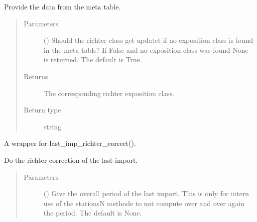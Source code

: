 \documentclass[letterpaper,10pt,english]{sphinxmanual}
\begin{document}
\begin{fulllineitems}
\begin{fulllineitems}
\sphinxAtStartPar
Provide the data from the meta table.
\begin{quote}\begin{description}
\item[{Parameters}] \leavevmode
\sphinxAtStartPar
{} (\sphinxstyleliteralemphasis{\sphinxupquote{, }}) \textendash{} Should the richter class get updatet if no exposition class is found in the meta table?
If False and no exposition class was found None is returned.
The default is True.

\item[{Returns}] \leavevmode
\sphinxAtStartPar
The corresponding richter exposition class.

\item[{Return type}] \leavevmode
\sphinxAtStartPar
string

\end{description}\end{quote}

\end{fulllineitems}


\begin{fulllineitems}
\label{\detokenize{weatherDB:weatherDB.station.PrecipitationStation.last_imp_corr}}
\sphinxAtStartPar
A wrapper for last\_imp\_richter\_correct().

\end{fulllineitems}


\begin{fulllineitems}
\label{\detokenize{weatherDB:weatherDB.station.PrecipitationStation.last_imp_richter_correct}}
\sphinxAtStartPar
Do the richter correction of the last import.
\begin{quote}\begin{description}
\item[{Parameters}] \leavevmode
\sphinxAtStartPar
{} (\sphinxstyleliteralemphasis{\sphinxupquote{, }}) \textendash{} Give the overall period of the last import.
This is only for intern use of the stationsN methode to not compute over and over again the period.
The default is None.


\end{description}
\end{quote}
\end{fulllineitems}
\end{fulllineitems}
\end{document}
